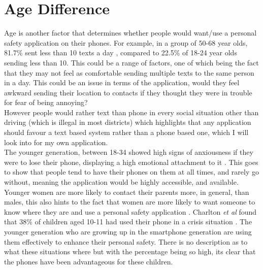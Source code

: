 \documentclass[a4paper]{report}
\begin{document}
\section{Age Difference}
\label{sec:ageDifference}
Age is another factor that determines whether people would want/use a personal safety application on their phones. For example, in a group of 50-68 year olds, 81.7\%
sent less than 10 texts a day \cite{forgays}, compared to 22.5\% of 18-24 year olds sending less than 10. This could be a range of factors, one of which being
the fact that they may not feel as comfortable sending multiple texts to the same person in a day. This could be an issue in terms of the application, would they
feel awkward sending their location to contacts if they thought they were in trouble for fear of being annoying? \\ However people would rather text than phone in every social situation other than
driving (which is illegal in most districts) \cite{forgays} which highlights that any application should favour a text based system rather than a phone based one, which I
will look into for my own application.
\\The younger generation, between 18-34 showed high signs of anxiousness if they were to lose their phone, displaying a high emotional attachment to it \cite{forgays}. This goes to show that
people tend to have their phones on them at all times, and rarely go without, meaning the application would be highly accessible, and available.
\\Younger women are more likely to contact their parents more, in general, than males, this also hints to the fact that women are more likely to want someone to know where they are
and use a personal safety application \cite{forgays}.
Charlton \textit{et al} found that 38\% of children aged 10-11 had used their phone in a crisis situation \cite{charlton}. The younger generation who are growing up in the smartphone generation are
using them effectively to enhance their personal safety. There is no description as to what these situations where but with the percentage being so high, its clear that the phones have been advantageous
for these children.
\end{document}
